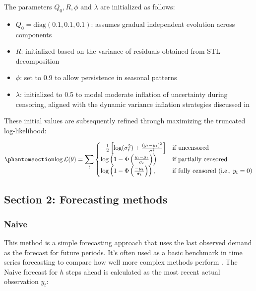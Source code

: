 \documentclass[
  authoryear,
  doubleblind,
  3p]{elsarticle}
\providecommand{\tightlist}{%
  \setlength{\itemsep}{0pt}\setlength{\parskip}{0pt}}
\begin{document}
The parameters \(Q_0, R, \phi\) and \(\lambda\) are initialized as
follows:

\begin{itemize}
\tightlist
\item
  \(Q_0 = \text{diag}(0.1, 0.1, 0.1)\): assumes gradual independent
  evolution across components \citep{harvey1990}
\item
  \(R\): initialized based on the variance of residuals obtained from
  STL decomposition \citep{durbin2012}
\item
  \(\phi\): set to 0.9 to allow persistence in seasonal patterns
  \citep{west1997}
\item
  \(\lambda\): initialized to 0.5 to model moderate inflation of
  uncertainty during censoring, aligned with the dynamic variance
  inflation strategies discussed in \citet{trapero2024}
\end{itemize}

These initial values are subsequently refined through maximizing the
truncated log-likelihood:

\begin{equation}\phantomsection\label{eq-twelve}{
\log \mathcal{L}(\theta) = \sum_t \begin{cases}
  -\frac{1}{2} \left[ \log(\sigma_t^2) + \frac{(y_t - \mu_t)^2}{\sigma_t^2} \right] & \text{if uncensored} \\
  \log \left(1 - \Phi\left(\frac{y_t - \mu_t}{\sigma_t}\right)\right) & \text{if partially censored} \\
  \log \left(1 - \Phi\left(\frac{-\mu_t}{\sigma_t} \right)\right), & \text{if fully censored (i.e., } y_t = 0\text{)}
\end{cases}
}\end{equation}

\pagebreak

\pagebreak

\subsection{Section 2: Forecasting methods}\label{sec-appendix_wp2_2}

\subsubsection{Naive}\label{naive}

This method is a simple forecasting approach that uses the last observed
demand as the forecast for future periods. It's often used as a basic
benchmark in time series forecasting to compare how well more complex
methods perform \citep{kolassa2023}. The Naive forecast for \(h\) steps
ahead is calculated as the most recent actual observation \(y_t\):
\end{document}
